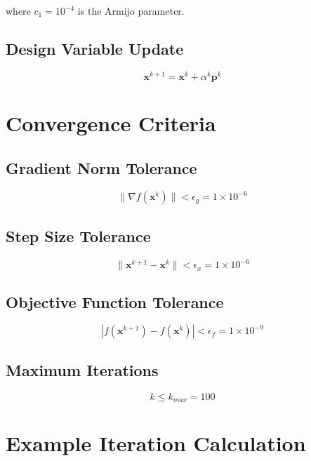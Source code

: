 \documentclass{article}
\begin{document}
where $c_1 = 10^{-4}$ is the Armijo parameter.

\subsection{Design Variable Update}
\begin{equation}
\mathbf{x}^{k+1} = \mathbf{x}^k + \alpha^k \mathbf{p}^k
\end{equation}

\section{Convergence Criteria}

\subsection{Gradient Norm Tolerance}
\begin{equation}
\|\nabla f(\mathbf{x}^k)\| < \epsilon_g = 1 \times 10^{-6}
\end{equation}

\subsection{Step Size Tolerance}
\begin{equation}
\|\mathbf{x}^{k+1} - \mathbf{x}^k\| < \epsilon_x = 1 \times 10^{-6}
\end{equation}

\subsection{Objective Function Tolerance}
\begin{equation}
|f(\mathbf{x}^{k+1}) - f(\mathbf{x}^k)| < \epsilon_f = 1 \times 10^{-9}
\end{equation}

\subsection{Maximum Iterations}
\begin{equation}
k \leq k_{max} = 100
\end{equation}

\section{Example Iteration Calculation}
\end{document}
